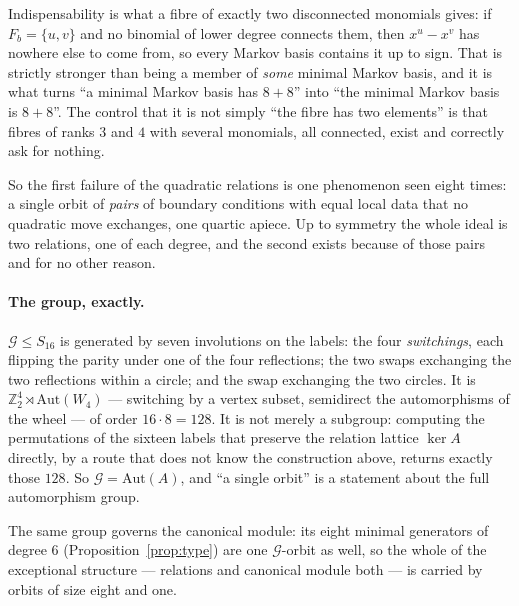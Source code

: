 \documentclass[11pt,a4paper]{article}
\theoremstyle{definition}
\newcommand{\ZZ}{\mathbb{Z}}
\begin{document}
\noindent
Indispensability is what a fibre of exactly two disconnected monomials gives: if $F_b=\{u,v\}$ and
no binomial of lower degree connects them, then $x^u-x^v$ has nowhere else to come from, so every
Markov basis contains it up to sign. That is strictly stronger than being a member of \emph{some}
minimal Markov basis, and it is what turns ``a minimal Markov basis has $8+8$'' into ``the minimal
Markov basis is $8+8$''. The control that it is not simply ``the fibre has two elements'' is that
fibres of ranks $3$ and $4$ with several monomials, all connected, exist and correctly ask for
nothing.

\noindent
So the first failure of the quadratic relations is one phenomenon seen eight times: a single orbit
of \emph{pairs} of boundary conditions with equal local data that no quadratic move exchanges, one
quartic apiece. Up to symmetry the whole ideal is two relations, one of each degree, and the
second exists because of those pairs and for no other reason.

\paragraph{The group, exactly.} $\mathcal G\le S_{16}$ is generated by seven involutions on the
labels: the four \emph{switchings}, each flipping the parity under one of the four reflections;
the two swaps exchanging the two reflections within a circle; and the swap exchanging the two
circles. It is $\ZZ_2^4\rtimes\mathrm{Aut}(W_4)$ --- switching by a vertex subset, semidirect
the automorphisms of the wheel --- of order $16\cdot8=128$. It is not merely a subgroup: computing
the permutations of the sixteen labels that preserve the relation lattice $\ker A$ directly, by a
route that does not know the construction above, returns exactly those $128$. So
$\mathcal G=\mathrm{Aut}(A)$, and ``a single orbit'' is a statement about the full automorphism
group.

The same group governs the canonical module: its eight minimal generators of degree $6$
(Proposition~\ref{prop:type}) are one $\mathcal G$-orbit as well, so the whole of the exceptional
structure --- relations and canonical module both --- is carried by orbits of size eight and one.
\end{document}
